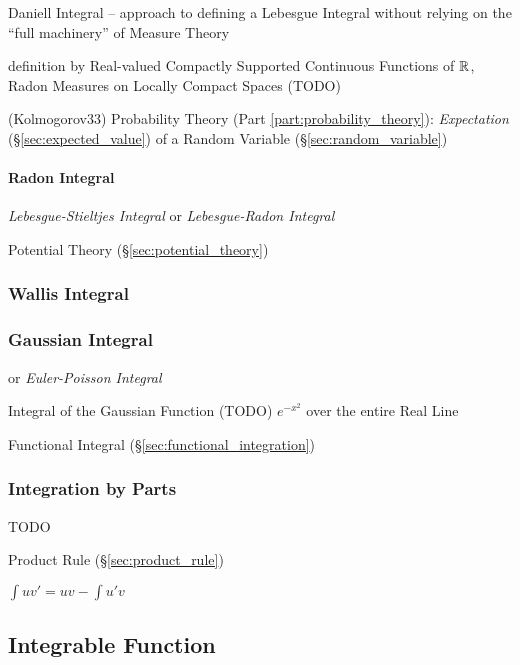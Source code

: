 Daniell Integral -- approach to defining a Lebesgue Integral without relying on
the ``full machinery'' of Measure Theory

definition by Real-valued Compactly Supported Continuous Functions of $\mathbb{R}$,
Radon Measures on Locally Compact Spaces
(TODO)

(Kolmogorov33) Probability Theory (Part \ref{part:probability_theory}):
\emph{Expectation} (\S\ref{sec:expected_value}) of a Random Variable
(\S\ref{sec:random_variable})



\paragraph{Radon Integral}\label{sec:radon_integral}\hfill

\emph{Lebesgue-Stieltjes Integral} or \emph{Lebesgue-Radon Integral}

Potential Theory (\S\ref{sec:potential_theory})



\subsubsection{Wallis Integral}\label{sec:wallis_integral}

\subsubsection{Gaussian Integral}\label{sec:gaussian_integral}

or \emph{Euler-Poisson Integral}

Integral of the Gaussian Function (TODO) $e^{-x^2}$ over the entire Real Line

\fist Functional Integral (\S\ref{sec:functional_integration})



\subsubsection{Integration by Parts}\label{sec:integration_by_parts}

TODO

\fist Product Rule (\S\ref{sec:product_rule})

$\int{uv'} = uv - \int{u'v}$



\subsection{Integrable Function}\label{sec:integrable_function}

